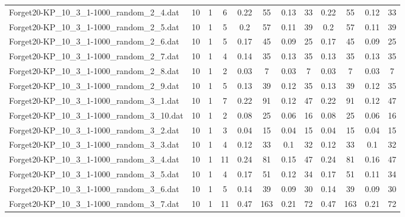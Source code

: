 \begin{sidewaystable}[!ht]
{\begin{tabular}{lccccccccccc}
Forget20-KP\_10\_3\_1-1000\_random\_2\_4.dat & 10 & 1 & 6 & 0.22 & 55 & 0.13 & 33 & 0.22 & 55 &  \textcolor{blue2}{0.12} & 33 \\
Forget20-KP\_10\_3\_1-1000\_random\_2\_5.dat & 10 & 1 & 5 & 0.2 & 57 &  \textcolor{blue2}{0.11} & 39 & 0.2 & 57 &  \textcolor{blue2}{0.11} & 39 \\
Forget20-KP\_10\_3\_1-1000\_random\_2\_6.dat & 10 & 1 & 5 & 0.17 & 45 &  \textcolor{blue2}{0.09} & 25 & 0.17 & 45 &  \textcolor{blue2}{0.09} & 25 \\
Forget20-KP\_10\_3\_1-1000\_random\_2\_7.dat & 10 & 1 & 4 & 0.14 & 35 &  \textcolor{blue2}{0.13} & 35 &  \textcolor{blue2}{0.13} & 35 &  \textcolor{blue2}{0.13} & 35 \\
Forget20-KP\_10\_3\_1-1000\_random\_2\_8.dat & 10 & 1 & 2 &  \textcolor{blue2}{0.03} & 7 &  \textcolor{blue2}{0.03} & 7 &  \textcolor{blue2}{0.03} & 7 &  \textcolor{blue2}{0.03} & 7 \\
Forget20-KP\_10\_3\_1-1000\_random\_2\_9.dat & 10 & 1 & 5 & 0.13 & 39 &  \textcolor{blue2}{0.12} & 35 & 0.13 & 39 &  \textcolor{blue2}{0.12} & 35 \\
Forget20-KP\_10\_3\_1-1000\_random\_3\_1.dat & 10 & 1 & 7 & 0.22 & 91 &  \textcolor{blue2}{0.12} & 47 & 0.22 & 91 &  \textcolor{blue2}{0.12} & 47 \\
Forget20-KP\_10\_3\_1-1000\_random\_3\_10.dat & 10 & 1 & 2 & 0.08 & 25 &  \textcolor{blue2}{0.06} & 16 & 0.08 & 25 &  \textcolor{blue2}{0.06} & 16 \\
Forget20-KP\_10\_3\_1-1000\_random\_3\_2.dat & 10 & 1 & 3 &  \textcolor{blue2}{0.04} & 15 &  \textcolor{blue2}{0.04} & 15 &  \textcolor{blue2}{0.04} & 15 &  \textcolor{blue2}{0.04} & 15 \\
Forget20-KP\_10\_3\_1-1000\_random\_3\_3.dat & 10 & 1 & 4 & 0.12 & 33 &  \textcolor{blue2}{0.1} & 32 & 0.12 & 33 &  \textcolor{blue2}{0.1} & 32 \\
Forget20-KP\_10\_3\_1-1000\_random\_3\_4.dat & 10 & 1 & 11 & 0.24 & 81 &  \textcolor{blue2}{0.15} & 47 & 0.24 & 81 & 0.16 & 47 \\
Forget20-KP\_10\_3\_1-1000\_random\_3\_5.dat & 10 & 1 & 4 & 0.17 & 51 & 0.12 & 34 & 0.17 & 51 &  \textcolor{blue2}{0.11} & 34 \\
Forget20-KP\_10\_3\_1-1000\_random\_3\_6.dat & 10 & 1 & 5 & 0.14 & 39 &  \textcolor{blue2}{0.09} & 30 & 0.14 & 39 &  \textcolor{blue2}{0.09} & 30 \\
Forget20-KP\_10\_3\_1-1000\_random\_3\_7.dat & 10 & 1 & 11 & 0.47 & 163 &  \textcolor{blue2}{0.21} & 72 & 0.47 & 163 &  \textcolor{blue2}{0.21} & 72 \\

\end{tabular}}
\end{sidewaystable}
